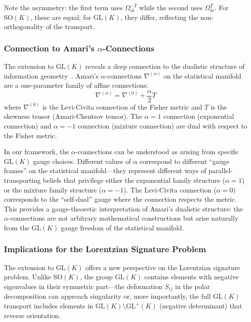 \documentclass[11pt]{article}
\begin{document}
Note the asymmetry: the first term uses $\Omega_{ik}^{-T}$ while the second uses $\Omega_{ki}^T$. For $\mathrm{SO}(K)$, these are equal; for $\mathrm{GL}(K)$, they differ, reflecting the non-orthogonality of the transport.

\subsubsection{Connection to Amari's $\alpha$-Connections}

The extension to $\mathrm{GL}(K)$ reveals a deep connection to the dualistic structure of information geometry~\cite{Amari2016}. Amari's $\alpha$-connections $\nabla^{(\alpha)}$ on the statistical manifold are a one-parameter family of affine connections:
\begin{equation}
\nabla^{(\alpha)} = \nabla^{(0)} + \frac{\alpha}{2}T
\end{equation}
where $\nabla^{(0)}$ is the Levi-Civita connection of the Fisher metric and $T$ is the skewness tensor (Amari-Chentsov tensor). The $\alpha = 1$ connection (exponential connection) and $\alpha = -1$ connection (mixture connection) are dual with respect to the Fisher metric.

In our framework, the $\alpha$-connections can be understood as arising from specific $\mathrm{GL}(K)$ gauge choices. Different values of $\alpha$ correspond to different ``gauge frames'' on the statistical manifold---they represent different ways of parallel-transporting beliefs that privilege either the exponential family structure ($\alpha = 1$) or the mixture family structure ($\alpha = -1$). The Levi-Civita connection ($\alpha = 0$) corresponds to the ``self-dual'' gauge where the connection respects the metric. This provides a gauge-theoretic interpretation of Amari's dualistic structure: the $\alpha$-connections are not arbitrary mathematical constructions but arise naturally from the $\mathrm{GL}(K)$ gauge freedom of the statistical manifold.

\subsubsection{Implications for the Lorentzian Signature Problem}

The extension to $\mathrm{GL}(K)$ offers a new perspective on the Lorentzian signature problem. Unlike $\mathrm{SO}(K)$, the group $\mathrm{GL}(K)$ contains elements with negative eigenvalues in their symmetric part---the deformation $S_{ij}$ in the polar decomposition can approach singularity or, more importantly, the full $\mathrm{GL}(K)$ transport includes elements in $\mathrm{GL}(K) \setminus \mathrm{GL}^+(K)$ (negative determinant) that reverse orientation.
\end{document}
